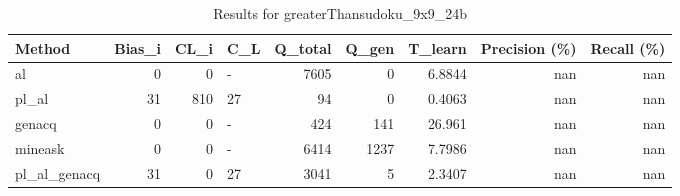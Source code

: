 \begin{table}[ht]
\caption{Results for greaterThansudoku_9x9_24b}
\begin{tabular}{lrrlrrrrr}
\hline
 Method       &   Bias\_i &   CL\_i & C\_L   &   Q\_total &   Q\_gen &   T\_learn &   Precision (\%) &   Recall (\%) \\
\hline
 al           &        0 &      0 & -     &      7605 &       0 &    6.8844 &             nan &          nan \\
 pl\_al        &       31 &    810 & 27    &        94 &       0 &    0.4063 &             nan &          nan \\
 genacq       &        0 &      0 & -     &       424 &     141 &   26.961  &             nan &          nan \\
 mineask      &        0 &      0 & -     &      6414 &    1237 &    7.7986 &             nan &          nan \\
 pl\_al\_genacq &       31 &      0 & 27    &      3041 &       5 &    2.3407 &             nan &          nan \\
\hline
\end{tabular}
\end{table}